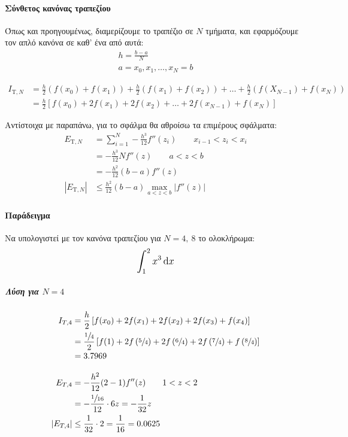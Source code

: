 \documentclass[11pt,a4paper,notitlepage,fleqn]{article}
\begin{document}
    \paragraph{Σύνθετος κανόνας τραπεζίου}
    Όπως και προηγουμένως, διαμερίζουμε το τραπέζιο σε \( N \) τμήματα,
    και εφαρμόζουμε τον απλό κανόνα σε καθ' ένα από αυτά:
    \begin{gather*}
    	h = \frac{b-a}{N} \\
    	a = x_0,x_1,\dots,x_N=b
    \end{gather*}
    
    \begin{align*}
    	I_{\mathrm T,N} &= \frac{h}{2} \left(f(x_0)+f(x_1)\right)
    	+ \frac{h}{2} \left(f(x_1)+f(x_2)\right) + \dots + \frac{h}{2}
    	\left(f(X_{N-1})+f(x_N)\right)
    	\\ &= \frac{h}{2} \left[
    	f(x_0)+2f(x_1)+2f(x_2)+\dots+2f(x_{N-1})+f(x_N)
    	\right]
    \end{align*}
    
    Αντίστοιχα με παραπάνω, για το σφάλμα θα αθροίσω τα επιμέρους
    σφάλματα:
    \begin{align*}
    	E_{\mathrm T,N} &= \sum_{i=1}^{N} -\frac{h^3}{12} f''(z_i)
    	\qquad x_{i-1} < z_i < x_i
    	\\ &= - \frac{h^3}{12} N f''(z) \qquad a<z<b
    	\\ &= -\frac{h^2}{12}(b-a)f''(z) \\
    	|E_{\mathrm T,N}| &\leq \frac{h^2}{12}(b-a)\max_{a<z<b}
    	\left|f''(z)\right|
    \end{align*}
    
    \paragraph{Παράδειγμα}
    Να υπολογιστεί με τον κανόνα τραπεζίου για \( N=4,\ 8 \) το
    ολοκλήρωμα:
    \[
    \mathlarger{\int_{1}^{2} x^3\dif x}
    \]
    \subparagraph{Λύση για \( N=4 \)}
    \begin{align*}
    	I_{T,4} &= \frac{h}{2} \left[
    	f(x_0)+2f(x_1)+2f(x_2)+2f(x_3)+f(x_4)
    	\right] \\ &= \frac{\sfrac{1}{4} }{2}\left[
    	f(1)+2f\left(\sfrac{5}{4}\right)+2f\left(\sfrac{6}{4}\right)
    	+2f\left(\sfrac{7}{4}\right)+f\left(\sfrac{8}{4}\right)
    	\right]
    	\\ &= 3.7969 \\[3ex]
    	E_{T,4} &= -\frac{h^2}{12}(2-1)f''(z) \qquad 1<z<2 \\
    	&= - \frac{\sfrac{1}{16} }{12} \cdot 6z = -\frac{1}{32}z
    	\\ \left|E_{T,4}\right| &\leq \frac{1}{32}\cdot 2
    	=\frac{1}{16} = 0.0625
    \end{align*}
    
\end{document}
